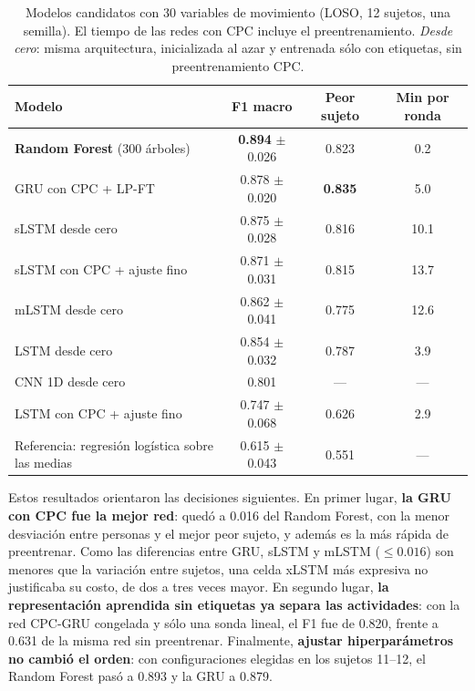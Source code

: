 \documentclass[letterpaper,11pt]{article}
\begin{document}
\begin{table}[H]
  \centering
  \small
  \caption{Modelos candidatos con 30 variables de movimiento (LOSO, 12 sujetos, una semilla). El tiempo de las redes con CPC incluye el preentrenamiento. \emph{Desde cero}: misma arquitectura, inicializada al azar y entrenada sólo con etiquetas, sin preentrenamiento CPC.}
  \label{tab:candidatos}
  \begin{tabular}{lccc}
    \toprule
    Modelo & F1 macro & Peor sujeto & Min por ronda \\
    \midrule
    \textbf{Random Forest} (300 árboles)  & \textbf{0.894} $\pm$ 0.026 & 0.823 & 0.2 \\
    GRU con CPC + LP-FT                   & 0.878 $\pm$ 0.020 & \textbf{0.835} & 5.0 \\
    sLSTM desde cero                      & 0.875 $\pm$ 0.028 & 0.816 & 10.1 \\
    sLSTM con CPC + ajuste fino           & 0.871 $\pm$ 0.031 & 0.815 & 13.7 \\
    mLSTM desde cero                      & 0.862 $\pm$ 0.041 & 0.775 & 12.6 \\
    LSTM desde cero                       & 0.854 $\pm$ 0.032 & 0.787 & 3.9 \\
    CNN 1D desde cero                     & 0.801 & --- & --- \\
    LSTM con CPC + ajuste fino            & 0.747 $\pm$ 0.068 & 0.626 & 2.9 \\
    Referencia: regresión logística sobre las medias & 0.615 $\pm$ 0.043 & 0.551 & --- \\
    \bottomrule
  \end{tabular}
\end{table}

Estos resultados orientaron las decisiones siguientes. En primer lugar, \textbf{la GRU con CPC fue la mejor red}: quedó a 0.016 del Random Forest, con la menor desviación entre personas y el mejor peor sujeto, y además es la más rápida de preentrenar. Como las diferencias entre GRU, sLSTM y mLSTM ($\le 0.016$) son menores que la variación entre sujetos, una celda xLSTM más expresiva no justificaba su costo, de dos a tres veces mayor. En segundo lugar, \textbf{la representación aprendida sin etiquetas ya separa las actividades}: con la red CPC-GRU congelada y sólo una sonda lineal, el F1 fue de 0.820, frente a 0.631 de la misma red sin preentrenar. Finalmente, \textbf{ajustar hiperparámetros no cambió el orden}: con configuraciones elegidas en los sujetos 11--12, el Random Forest pasó a 0.893 y la GRU a 0.879.
\end{document}
